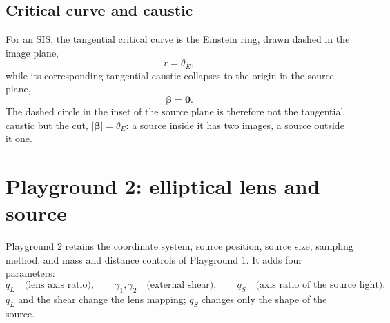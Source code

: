 \documentclass[11pt,a4paper]{article}
\newcommand{\vect}[1]{\bm{#1}}
\newcommand{\be}{\boldsymbol{\beta}}
\begin{document}
\subsection{Critical curve and caustic}
For an SIS, the tangential critical curve is the Einstein ring, drawn dashed in the image plane,
\begin{equation}
 r=\theta_E,
\end{equation}
while its corresponding tangential caustic collapses to the origin in the source plane,
\begin{equation}
 \be=\vect{0}.
\end{equation}
The dashed circle in the inset of the source plane is therefore not the tangential caustic but the cut, $|\be|=\theta_E$: a source inside it has two images, a source outside it one.

\section{Playground 2: elliptical lens and source}
Playground 2 retains the coordinate system, source position, source size, sampling method, and mass and distance controls of Playground 1. It adds four parameters:
\begin{equation}
 q_L \quad\text{(lens axis ratio)},\qquad
 \gamma_1,\gamma_2 \quad\text{(external shear)},\qquad
 q_S \quad\text{(axis ratio of the source light)}.
\end{equation}
$q_L$ and the shear change the lens mapping; $q_S$ changes only the shape of the source.
\end{document}
